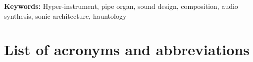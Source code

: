 \documentclass[12pt,twoside,maitrise]{dms_ks}
\newlength{\oldparskip}
\let\oldtableofcontents\tableofcontents  %
\renewcommand{\tableofcontents}{  %
    \begingroup
    \setlength{\parskip}{0pt}  %
    \oldtableofcontents  %
    \endgroup
    \setlength{\parskip}{\oldparskip}  %
}
\theoremstyle{definition}
\begin{document}
\textbf{Keywords:} Hyper-instrument, pipe organ, sound design, composition, audio synthesis, sonic architecture, hauntology



\anglais
\cleardoublepage
{}  %
\anglais
\tableofcontents
\cleardoublepage
\anglais
\english
{}  %
\listoftables
\cleardoublepage
{}

\chapter*{List of acronyms and abbreviations}
\begin{twocolumnlist}{.2\textwidth}{.7\textwidth}
\end{twocolumnlist}
\end{document}
